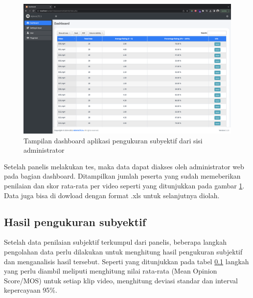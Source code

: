 \begin{figure}[H]
	\vspace{-0.1cm}
	\begin{center}
		\includegraphics[width=1\columnwidth]{bab4/Gambar/aplikasi-admin.png}
	\end{center}
	\vspace{-0.2cm}
	\caption{Tampilan dashboard aplikasi pengukuran subyektif dari sisi administrator}
	\label{aplikasi-admin}
\end{figure}

Setelah panelis melakukan tes, maka data dapat diakses oleh administrator web  pada bagian dashboard. Ditampilkan jumlah peserta yang sudah memeberikan penilaian dan skor rata-rata per video seperti yang ditunjukkan pada gambar \ref{aplikasi-admin}. Data juga bisa di dowload dengan format .xls untuk selanjutnya diolah. 

\subsection{Hasil pengukuran subyektif}
\hspace{1,2cm}
Setelah data penilaian subjektif terkumpul dari panelis, beberapa langkah pengolahan data perlu dilakukan untuk menghitung hasil pengukuran subjektif dan menganalisis hasil tersebut. Seperti yang ditunjukkan pada tabel \ref{} langkah yang perlu diambil meliputi menghitung nilai rata-rata (Mean Opinion Score/MOS) untuk setiap klip video, menghitung deviasi standar dan interval kepercayaan 95\%.

